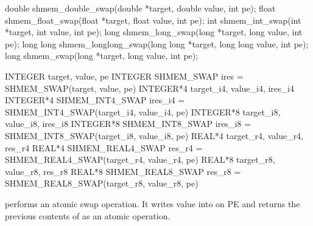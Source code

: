 \synC
 	  
double shmem_double_swap(double *target, double value, int pe);
float shmem_float_swap(float *target, float value, int pe);
int shmem_int_swap(int *target, int value, int pe);
long shmem_long_swap(long *target, long value, int pe);
long long shmem_longlong_swap(long long *target, long long value, int pe);
long shmem_swap(long *target, long value, int pe); %

\synF   %

INTEGER target, value, pe
INTEGER SHMEM_SWAP
ires = SHMEM_SWAP(target, value, pe) 
INTEGER*4 target_i4, value_i4, ires_i4
INTEGER*4 SHMEM_INT4_SWAP
ires_i4 = SHMEM_INT4_SWAP(target_i4, value_i4, pe) 
INTEGER*8 target_i8, value_i8, ires_i8
INTEGER*8 SHMEM_INT8_SWAP
ires_i8 = SHMEM_INT8_SWAP(target_i8, value_i8, pe)
REAL*4 target_r4, value_r4, res_r4
REAL*4 SHMEM_REAL4_SWAP
res_r4 = SHMEM_REAL4_SWAP(target_r4, value_r4, pe) 
REAL*8 target_r8, value_r8, res_r8
REAL*8 SHMEM_REAL8_SWAP
res_r8 = SHMEM_REAL8_SWAP(target_r8, value_r8, pe)%

{        performs  an atomic swap operation. It writes value  into \target{} on \ac{PE} and	returns the previous
       contents of \target{} as an atomic operation. 
}
{
\hfill \\
{
}
}
\eAPI
